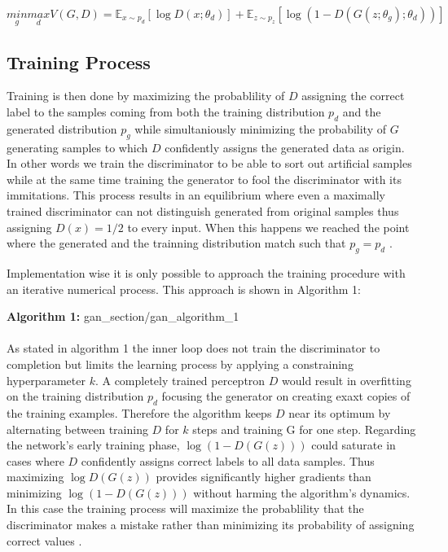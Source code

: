   \[
  \underset{g}{min} \underset{d}{max} V(G,D) =  \mathbb{E}_{x \sim p_d}[\log D(x; \theta_d)] + \mathbb{E}_{z \sim p_z}[\log(1 - D(G(z; \theta_g); \theta_d))]
  \]

  \cite[Equation (1)]{1}

  \subsection{Training Process}

  Training is then done by maximizing the probablility of \( D \) assigning the correct label to the samples coming from both the training distribution \( p_d \) and the generated distribution \( p_g \) while simultaniously minimizing the probability of \( G \) generating samples to which \( D \) confidently assigns the generated data as origin.
  In other words we train the discriminator to be able to sort out artificial samples while at the same time training the generator to fool the discriminator with its immitations.
  This process results in an equilibrium where even a maximally trained discriminator can not distinguish generated from original samples thus assigning \( D(x) = 1/2 \) to every input.
  When this happens we reached the point where the generated and the trainning distribution match such that \( p_g = p_d \) \cite{1}.

  Implementation wise it is only possible to approach the training procedure with an iterative numerical process.
  This approach is shown in Algorithm 1:

    \pagebreak
    \textbf{Algorithm 1:}
    {gan_section/gan_algorithm_1}
    \cite[Algorithm (1)]{1}
  \\
  \\
  As stated in algorithm 1 the inner loop does not train the discriminator to completion but limits the learning process by applying a constraining hyperparameter \( k \).
  A completely trained perceptron \( D \) would result in overfitting on the training distribution \( p_d \) focusing the generator on creating exaxt copies of the training examples.
  Therefore the algorithm keeps \( D \) near its optimum by alternating between training \( D \) for \( k \) steps and training G for one step.
  Regarding the network's early training phase, \( \log ( 1 - D(G(z)) ) \) could saturate in cases where \( D \) confidently assigns correct labels to all data samples.
  Thus maximizing \( \log D(G(z)) \) provides significantly higher gradients than minimizing \( \log( 1 - D(G(z)) ) \) without harming the algorithm's dynamics. In this case the training process will maximize the probablility that the discriminator makes a mistake rather than minimizing its probability of assigning correct values \cite{1}.


